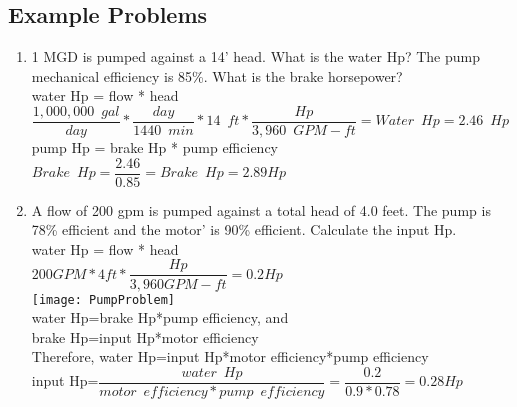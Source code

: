 \subsection{Example Problems}
\begin{enumerate}


\item 1 MGD is pumped against a 14’ head.  What is the water Hp?  The pump mechanical efficiency is 85\%.  What is the brake horsepower?\\
\vspace{0.4cm}
water Hp = flow * head\\
\vspace{0.4cm}
$\dfrac{1,000,000 \enspace gal}{day}*\dfrac{day}{1440 \enspace min}*14 \enspace ft*\dfrac{Hp}{3,960 \enspace GPM-ft}=\boxed{Water \enspace Hp = 2.46 \enspace Hp}$\\
\vspace{0.4cm}
pump Hp = brake Hp * pump efficiency\\
\vspace{0.4cm}
$Brake \enspace Hp = \dfrac{2.46}{0.85}=\boxed{Brake \enspace Hp=2.89Hp}$\\
\vspace{0.4cm}

\item A flow of 200 gpm  is pumped against a total head of 4.0 feet. The pump is 78\% efficient and the motor' is 90\% efficient. Calculate the input Hp.\\
\vspace{0.4cm}
water Hp = flow * head\\
\vspace{0.2cm}
$200GPM*4ft*\dfrac{Hp}{3,960 GPM-ft}=0.2Hp$\\
\vspace{0.4cm}\texttt{[image: PumpProblem]}\\
water Hp=brake Hp*pump efficiency, and\\
brake Hp=input Hp*motor efficiency\\
Therefore, water Hp=input Hp*motor efficiency*pump efficiency\\
\vspace{0.4cm}
input Hp=$\dfrac{water \enspace Hp}{motor \enspace efficiency*pump \enspace efficiency}=\dfrac{0.2}{0.9*0.78}=\boxed{0.28Hp}$
\vspace{0.2cm}
\end{enumerate}

